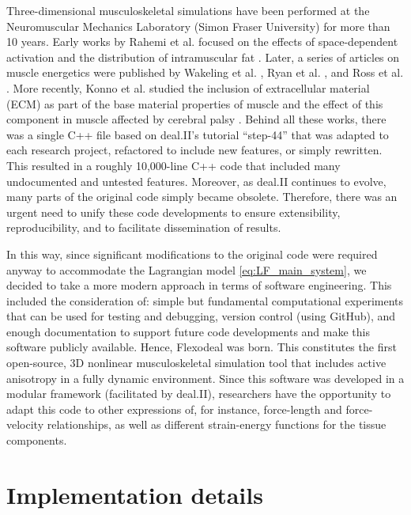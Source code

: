 \documentclass{sfuthesis}
\numberwithin{equation}{section}
\numberwithin{figure}{chapter}
\numberwithin{table}{chapter}
\theoremstyle{definition}
\begin{document}
Three-dimensional musculoskeletal simulations have been performed at the Neuromuscular Mechanics Laboratory (Simon Fraser University) for more than 10 years. Early works by Rahemi et al. focused on the effects of space-dependent activation \cite{RahemiNigamWakeling2014} and the distribution of intramuscular fat \cite{RahemiNigamWakeling2015}. Later, a series of articles on muscle energetics were published by Wakeling et al. \cite{Paper1_WakelingEtAl2020}, Ryan et al. \cite{Paper2_RyanEtAl2020}, and Ross et al. \cite{Paper3_RossEtAl2021}. More recently, Konno et al. studied the inclusion of extracellular material (ECM) as part of the base material properties of muscle \cite{KonnoNigamWakeling2021_ECM} and the effect of this component in muscle affected by cerebral palsy \cite{KonnoEtAl2022_CP}. Behind all these works, there was a single C++ file based on deal.II's tutorial ``step-44'' \cite{step44} that was adapted to each research project, refactored to include new features, or simply rewritten. This resulted in a roughly 10,000-line C++ code that included many undocumented and untested features. Moreover, as deal.II continues to evolve, many parts of the original code simply became obsolete. Therefore, there was an urgent need to unify these code developments to ensure extensibility, reproducibility, and to facilitate dissemination of results.

In this way, since significant modifications to the original code were required anyway to accommodate the Lagrangian model \eqref{eq:LF_main_system}, we decided to take a more modern approach in terms of software engineering. This included the consideration of: simple but fundamental computational experiments that can be used for testing and debugging, version control (using GitHub), and enough documentation to support future code developments and make this software publicly available. Hence, Flexodeal was born. This constitutes the first open-source, 3D nonlinear musculoskeletal simulation tool that includes active anisotropy in a fully dynamic environment. Since this software was developed in a modular framework (facilitated by deal.II), researchers have the opportunity to adapt this code to other expressions of, for instance, force-length and force-velocity relationships, as well as different strain-energy functions for the tissue components.


\section{Implementation details} \label{sec:flexodeal_implementation}
\end{document}
